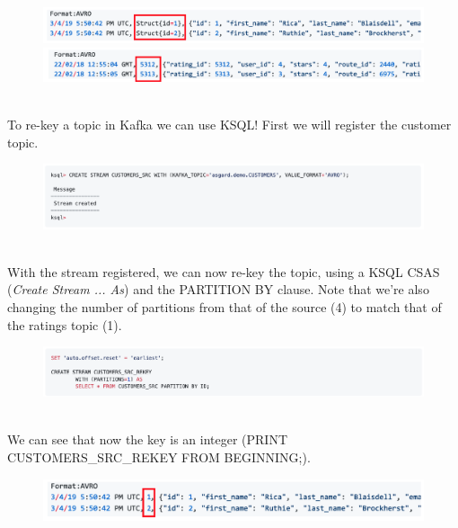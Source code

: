 \documentclass[10pt,a4paper]{article}
\begin{document}
\begin{enumerate}
     \begin{figure}[ht!]
 \hfill \includegraphics[width=400pt]{images/ksql-key1}\hspace*{\fill}
\vspace{0.1em} \center 
 \hfill \includegraphics[width=400pt]{images/ksql-key2}\hspace*{\fill} 
 \end{figure} \\
 To re-key a topic in Kafka we can use KSQL! First we will register the customer topic.
    \begin{figure}[ht!]
 \hfill \includegraphics[width=400pt]{images/ksql-cmd15}\hspace*{\fill} 
 \end{figure} \\
 \pagebreak
 With the stream registered, we can now re-key the topic, using a KSQL CSAS (\textit{Create Stream ... As}) and the PARTITION BY clause. Note that we’re also changing the number of partitions from that of the source (4) to match that of the ratings topic (1).
     \begin{figure}[ht!]
 \hfill \includegraphics[width=400pt]{images/ksql-cmd16}\hspace*{\fill} 
 \end{figure} \\
We can see that now the key is an integer (PRINT CUSTOMERS\_SRC\_REKEY FROM BEGINNING;).
     \begin{figure}[ht!]
 \hfill \includegraphics[width=400pt]{images/ksql-cmd17}\hspace*{\fill} 

\end{figure}
\end{enumerate}
\end{document}
